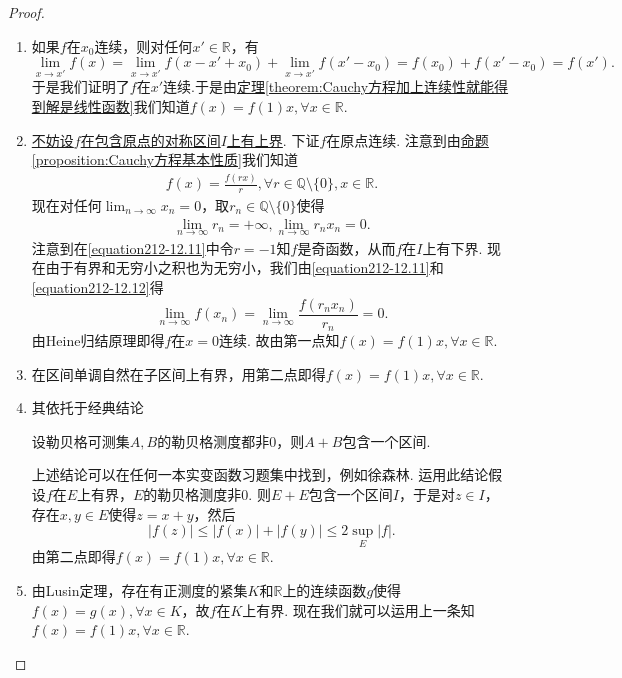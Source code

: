 \documentclass[../../main.tex]{subfiles}
\begin{document}
\begin{proof}
\begin{enumerate}
\item 如果\(f\)在\(x_0\)连续，则对任何\(x'\in\mathbb{R}\)，有
\[
\lim_{x\rightarrow x'} f(x)=\lim_{x\rightarrow x'} f(x - x'+x_0)+\lim_{x\rightarrow x'} f(x' - x_0)=f(x_0)+f(x' - x_0)=f(x').
\]
于是我们证明了\(f\)在\(x'\)连续.于是由\hyperref[theorem:Cauchy方程加上连续性就能得到解是线性函数]{定理\ref{theorem:Cauchy方程加上连续性就能得到解是线性函数}}我们知道\(f(x)=f(1)x,\forall x\in\mathbb{R}\).

\item \hyperlink{不妨设的原因112}{不妨设\(f\)在包含原点的对称区间\(I\)上有上界}. 下证\(f\)在原点连续. 注意到由\hyperref[proposition:Cauchy方程基本性质]{命题\ref{proposition:Cauchy方程基本性质}}我们知道
\begin{align}
f(x)=\frac{f(rx)}{r},\forall r\in\mathbb{Q}\setminus\{0\},x\in\mathbb{R}.\label{equation212-12.11}
\end{align}
现在对任何\(\lim_{n\rightarrow\infty}x_n = 0\)，取\(r_n\in\mathbb{Q}\setminus\{0\}\)使得
\begin{align}
\lim_{n\rightarrow\infty}r_n=+\infty,\lim_{n\rightarrow\infty}r_nx_n = 0.\label{equation212-12.12} 
\end{align}
注意到在\eqref{equation212-12.11}中令\(r = -1\)知\(f\)是奇函数，从而\(f\)在\(I\)上有下界. 现在由于有界和无穷小之积也为无穷小，我们由\eqref{equation212-12.11}和\eqref{equation212-12.12}得
\[
\lim_{n\rightarrow\infty} f(x_n)=\lim_{n\rightarrow\infty}\frac{f(r_nx_n)}{r_n}=0.
\]
由Heine归结原理即得\(f\)在\(x = 0\)连续. 故由第一点知\(f(x)=f(1)x,\forall x\in\mathbb{R}\).

\item 在区间单调自然在子区间上有界，用第二点即得\(f(x)=f(1)x,\forall x\in\mathbb{R}\).

\item 其依托于经典结论
\begin{conclusion}
设勒贝格可测集\(A,B\)的勒贝格测度都非\(0\)，则\(A + B\)包含一个区间.
\end{conclusion}
上述结论可以在任何一本实变函数习题集中找到，例如徐森林. 运用此结论假设\(f\)在\(E\)上有界，\(E\)的勒贝格测度非\(0\). 则\(E + E\)包含一个区间\(I\)，于是对\(z\in I\)，存在\(x,y\in E\)使得\(z = x + y\)，然后
\[
|f(z)|\leqslant|f(x)|+|f(y)|\leqslant 2\sup_E|f|.
\]
由第二点即得\(f(x)=f(1)x,\forall x\in\mathbb{R}\).

\item 由Lusin定理，存在有正测度的紧集\(K\)和\(\mathbb{R}\)上的连续函数\(g\)使得\(f(x)=g(x),\forall x\in K\)，故\(f\)在\(K\)上有界.
现在我们就可以运用上一条知\(f(x)=f(1)x,\forall x\in\mathbb{R}\).


\end{enumerate}
\end{proof}
\end{document}
